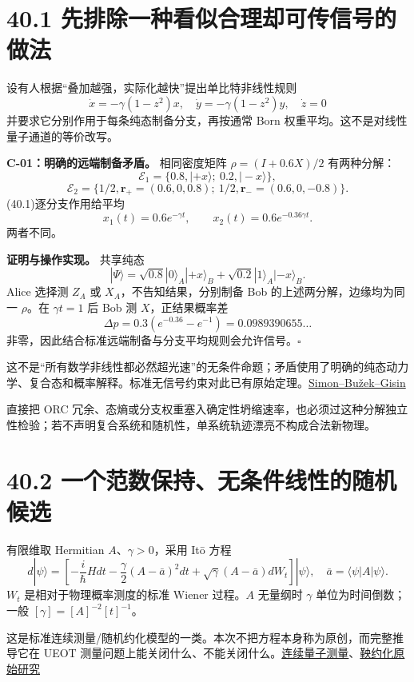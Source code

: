 \documentclass[
  11pt,
  oneside]{book}
\begin{document}
\section{40.1 先排除一种看似合理却可传信号的做法}

设有人根据``叠加越强，实际化越快''提出单比特非线性规则 \[
\dot x=-\gamma(1-z^2)x,\quad
\dot y=-\gamma(1-z^2)y,\quad \dot z=0
\tag{40.1}
\] 并要求它分别作用于每条纯态制备分支，再按通常 Born
权重平均。这不是对线性量子通道的等价改写。

\protect\hypertarget{c-01}{}{}

\textbf{C-01：明确的远端制备矛盾。} 相同密度矩阵 \(\rho=(I+0.6X)/2\)
有两种分解： \[
\mathcal E_1=\{0.8,|+x\rangle;\ 0.2,|-x\rangle\},
\] \[
\mathcal E_2=\{1/2,\mathbf r_+=(0.6,0,0.8);\
1/2,\mathbf r_-=(0.6,0,-0.8)\}.
\] (40.1)逐分支作用给平均 \[
x_1(t)=0.6e^{-\gamma t},\qquad
x_2(t)=0.6e^{-0.36\gamma t}.
\tag{40.2}
\] 两者不同。

\textbf{证明与操作实现。} 共享纯态 \[
|\Psi\rangle=\sqrt{0.8}|0\rangle_A|+x\rangle_B
+\sqrt{0.2}|1\rangle_A|-x\rangle_B.
\] Alice 选择测 \(Z_A\) 或 \(X_A\)，不告知结果，分别制备 Bob
的上述两分解，边缘均为同一 \(\rho\)。在 \(\gamma t=1\) 后 Bob 测
\(X\)，正结果概率差 \[
\Delta p=0.3(e^{-0.36}-e^{-1})=0.0989390655\ldots
\] 非零，因此结合标准远端制备与分支平均规则会允许信号。\(\square\)

这不是``所有数学非线性都必然超光速''的无条件命题；矛盾使用了明确的纯态动力学、复合态和概率解释。标准无信号约束对此已有原始定理。\href{https://arxiv.org/abs/quant-ph/0102125}{Simon--Bužek--Gisin}

直接把 ORC
冗余、态熵或分支权重塞入确定性坍缩速率，也必须过这种分解独立性检验；若不声明复合系统和随机性，单系统轨迹漂亮不构成合法新物理。

\section{40.2 一个范数保持、无条件线性的随机候选}

有限维取 Hermitian \(A\)、\(\gamma>0\)，采用 Itō 方程 \[
d|\psi\rangle=
\left[-\frac{i}{\hbar}Hdt
-\frac{\gamma}{2}(A-\bar a)^2dt
+\sqrt\gamma(A-\bar a)dW_t\right]|\psi\rangle,
\quad \bar a=\langle\psi|A|\psi\rangle.
\tag{40.3}
\] \(W_t\) 是相对于物理概率测度的标准 Wiener 过程。\(A\) 无量纲时
\(\gamma\) 单位为时间倒数；一般 \([\gamma]=[A]^{-2}[t]^{-1}\)。

这是标准连续测量/随机约化模型的一类。本次不把方程本身称为原创，而完整推导它在
UEOT
测量问题上能关闭什么、不能关闭什么。\href{https://arxiv.org/abs/1301.3626}{连续量子测量}、\href{https://arxiv.org/abs/quant-ph/0107153}{鞅约化原始研究}
\end{document}
